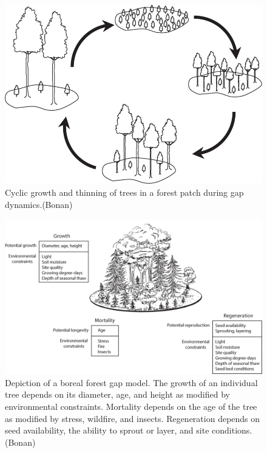 \documentclass[12pt,oneside]{book}
\begin{document}
\begin{figure}

{\centering \includegraphics[width=0.8\linewidth]{figures/chap6/f69_gap_dynamics} 

}

\caption{Cyclic growth and thinning of trees in a forest patch during gap dynamics.(Bonan)}\label{fig:f69}
\end{figure}

\begin{figure}

{\centering \includegraphics[width=0.8\linewidth]{figures/chap6/f610_gap_model} 

}

\caption{Depiction of a boreal forest gap model. The growth of an individual tree depends on its diameter, age, and height as modified by environmental constraints. Mortality depends on the age of the tree as modified by stress, wildfire, and insects. Regeneration depends on seed availability, the ability to sprout or layer, and site conditions. (Bonan)}\label{fig:f610}
\end{figure}
\end{document}
